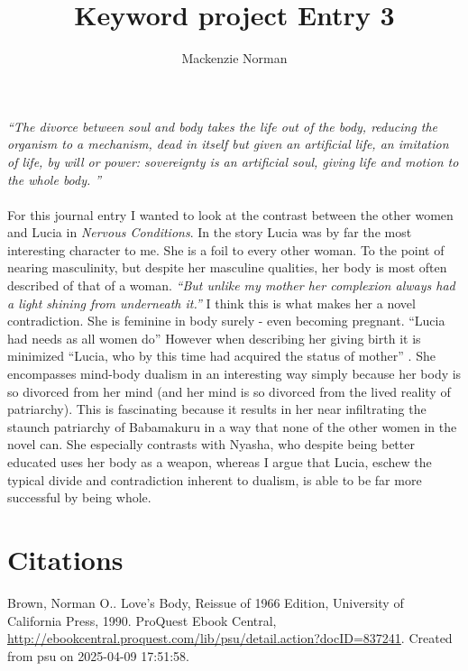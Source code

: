 \documentclass{article}
\title{Keyword project Entry 3}
\author{Mackenzie Norman}
\date{}
\begin{document}
\doublespacing 
\maketitle
\textit{``The divorce between soul and body takes the life out of the body, reducing the organism to a mechanism, dead in itself but given an artificial life, an imitation of life, by will or power: sovereignty is an artificial soul, giving life and motion to the whole body. ''}
\paragraph{}

For this journal entry I wanted to look at the contrast between the other women and Lucia in \textit{Nervous Conditions}. In the story Lucia was by far the most interesting character to me. She is a foil to every other woman. To the point of nearing masculinity, but despite her masculine qualities, her body is most often described of that of a woman. \textit{``But unlike my mother her complexion always had a light shining from underneath it.'' } I think this is what makes her a novel contradiction. She is feminine in body surely - even becoming pregnant. ``Lucia had needs as all women do'' However when describing her giving birth it is minimized ``Lucia, who by this time had acquired the status of mother'' .  She encompasses mind-body dualism in an interesting way simply because her body is so divorced from her mind (and her mind is so divorced from the lived reality of patriarchy). This is fascinating because it results in her near infiltrating the staunch patriarchy of Babamakuru in a way that none of the other women in the novel can. She especially contrasts with Nyasha, who despite being better educated uses her body as a weapon, whereas I argue that Lucia, eschew the typical divide and contradiction inherent to dualism, is able to be far more successful by being whole.




\section{Citations}

Brown, Norman O.. Love's Body, Reissue of 1966 Edition, University of California Press, 1990. ProQuest Ebook Central, \url{http://ebookcentral.proquest.com/lib/psu/detail.action?docID=837241}.
Created from psu on 2025-04-09 17:51:58. 
\end{document}

